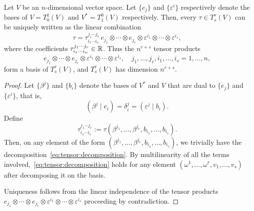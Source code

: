 \begin{proposition}\label{prop:tensorbasis}
  Let $V$ be an $n$-dimensional vector space.
  Let $\{e_j\}$ and $\{\varepsilon^i\}$ respectively denote the bases of $V=T_0^1(V)$ and $V^*=T_1^0(V)$ respectively.
  Then, every $\tau\in T_s^r(V)$ can be uniquely written as the linear combination%
  \begin{equation}\label{eq:tensor:decomposition}
    \tau = \tau^{j_1\cdots j_r}_{i_1\cdots i_s} \, e_{j_1}\otimes\cdots\otimes e_{j_r}\otimes \varepsilon^{i_1}\otimes \cdots\otimes \varepsilon^{i_s},
  \end{equation}
  where the coefficients $\tau^{j_1\cdots j_r}_{i_1\cdots i_n}\in\mathbb{R}$.
  Thus the $n^{r+s}$ tensor products
  \begin{equation}\label{eq:tensor:decompo}
    e_{j_1}\otimes\cdots\otimes e_{j_r}\otimes \varepsilon^{i_1}\otimes \cdots\otimes \varepsilon^{i_s}, \quad j_1,\ldots,j_r, i_1,\ldots,i_s = 1,\ldots,n,
  \end{equation}
  form a basis of $T_s^r(V)$, and $T_s^r(V)$ has dimension $n^{r+s}$.
\end{proposition}

\begin{proof}
  Let $\{\beta^j\}$ and $\{b_i\}$ denote the bases of $V^*$ and $V$ that are dual to $\{e_j\}$ and $\{\varepsilon^i\}$, that is,
  \begin{equation}
    (\beta^j\mid e_i) = \delta^j_i = (\varepsilon^j \mid b_i).
  \end{equation}
  Define
  \begin{equation}
    \tau^{j_1\cdots j_r}_{i_1\cdots i_s} := \tau(\beta^{j_1}, \ldots, \beta^{j_r}, b_{i_1}, \ldots, b_{i_s}).
  \end{equation}
  Then, on any element of the form $(\beta^{j_1}, \ldots, \beta^{j_r}, b_{i_1}, \ldots, b_{i_s})$, we trivially have the decomposition~\eqref{eq:tensor:decomposition}. By multilinearity of all the terms involved,~\eqref{eq:tensor:decomposition} holds for any element $(\omega^1, \ldots, \omega^r, v_1, \ldots, v_s)$ after decomposing it on the basis.

  Uniqueness follows from the linear independence of the tensor products $e_{j_1}\otimes\cdots\otimes e_{j_r}\otimes \varepsilon^{i_1}\otimes \cdots\otimes \varepsilon^{i_s}$ proceeding by contradiction.
\end{proof}

